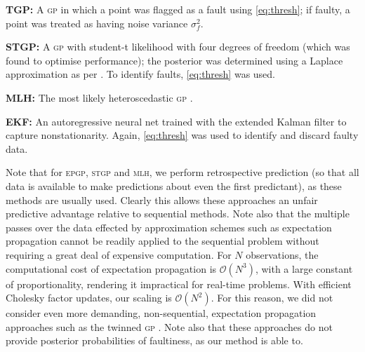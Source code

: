 \documentclass[twoside]{article}
\newcommand{\given}{\!\ensuremath{\mid}\!}
\newcommand{\bm}[1]{\ensuremath{\mathbf{#1}}}
\newcommand{\acro}[1]{\textsc{\MakeLowercase{#1}}}
\newcommand{\vect}[1]{\bm{#1}}
\newcommand{\vy}{\vect{y}}
\newcommand{\mean}[2]{{m}(#1\given#2)}
\begin{document}
{\bf TGP:}
A \acro{gp} in which a point was flagged as a fault using \eqref{eq:thresh}; if faulty, a point was treated as having noise variance $\sigma_f^2$.

{\bf STGP:}
A \acro{gp} with student-t likelihood with four degrees of freedom (which was found to optimise performance); the posterior was determined using a Laplace approximation as per \citet{vanhatalo2009gaussian}. To identify faults, \eqref{eq:thresh} was used.


{\bf MLH:} 
The most likely heteroscedastic  \acro{gp} \citep{kersting2007most}. 

{\bf EKF:}
An autoregressive neural net trained with the extended Kalman filter to capture nonstationarity. Again, \eqref{eq:thresh} was used to identify and discard faulty data.

Note that for \acro{epgp}, \acro{stgp} and \acro{mlh}, we perform retrospective prediction (so that all data is available to make predictions about even the first predictant), as these methods are usually used. Clearly this allows these approaches an unfair predictive advantage relative to sequential methods. Note also that the multiple passes over the data effected by approximation schemes such as expectation propagation cannot be readily applied to the sequential problem without requiring a great deal of expensive computation. For $N$ observations, the computational cost of expectation propagation is $\mathcal{O}(N^3)$, with a large constant of proportionality, rendering it impractical for real-time problems. With efficient Cholesky factor updates, our scaling is $\mathcal{O}(N^2)$. For this reason, we did not consider even more demanding, non-sequential, expectation propagation approaches such as the twinned \acro{gp} \citep{naish2008robust}. Note also that these approaches do not provide posterior probabilities of faultiness, as our method is able to. 
\end{document}
